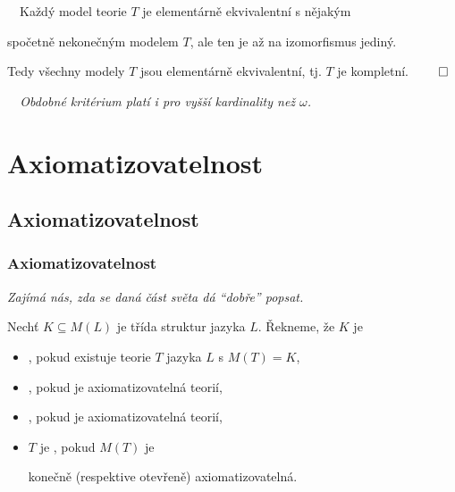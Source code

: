 {\it {}}\ \ Každý model teorie $T$ je elementárně ekvivalentní s nějakým
\smallskip

spočetně nekonečným modelem $T$, ale ten je až na izomorfismus jediný.
\smallskip

Tedy všechny modely $T$ jsou elementárně ekvivalentní, tj. $T$ je kompletní. $\qed$
\bigskip

\smallskip

\bigskip

{\it {}\ \ Obdobné kritérium platí i pro vyšší kardinality než $\omega$.}


\section{Axiomatizovatelnost}\todo


\subsection{Axiomatizovatelnost}
\subsubsection*{Axiomatizovatelnost}

{\it Zajímá nás, zda se daná část světa dá ``dobře'' popsat.}
\medskip

Nechť $K\subseteq M(L)$ je třída struktur jazyka $L$. Řekneme, že $K$ je
\vspace{0.5mm}

\begin{itemize}
\item {}, pokud existuje teorie $T$ jazyka $L$ s $M(T)=K$, %
\smallskip

\item {}, pokud je axiomatizovatelná  teorií,
\smallskip

\item {}, pokud je axiomatizovatelná  teorií,
\smallskip


\item {} $T$ je , pokud $M(T)$ je
\smallskip

konečně (respektive otevřeně) axiomatizovatelná.
\end{itemize}
\medskip

